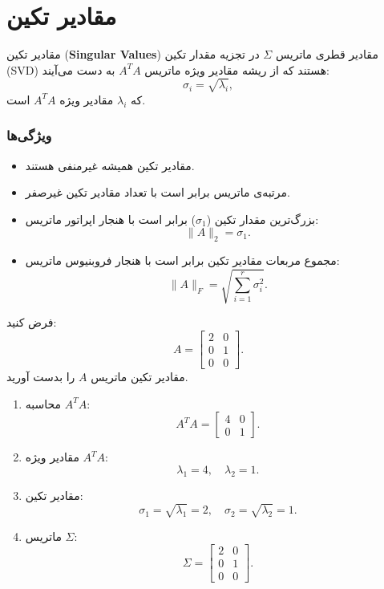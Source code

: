 \section{مقادیر تکین}
\begin{definition}
	مقادیر تکین (\textbf{Singular Values}) مقادیر قطری ماتریس \(\Sigma\) در تجزیه مقدار تکین (SVD) هستند که از ریشه مقادیر ویژه ماتریس \(A^T A\) به دست می‌آیند:
	\[
	\sigma_i = \sqrt{\lambda_i},
	\]
	که \(\lambda_i\) مقادیر ویژه \(A^T A\) است.
\end{definition}
\subsubsection{ویژگی‌ها}
\begin{itemize}
	\item مقادیر تکین همیشه غیرمنفی هستند.
	\item مرتبه‌ی ماتریس برابر است با تعداد مقادیر تکین غیرصفر.
	\item بزرگ‌ترین مقدار تکین (\(\sigma_1\)) برابر است با هنجار اپراتور ماتریس:
	\[
	\|A\|_2 = \sigma_1.
	\]
	\item مجموع مربعات مقادیر تکین برابر است با هنجار فروبنیوس ماتریس:
	\[
	\|A\|_F = \sqrt{\sum_{i=1}^r \sigma_i^2}.
	\]
\end{itemize}
\begin{example}
	
	فرض کنید:
	\[
	A = \begin{bmatrix}
		2 & 0 \\
		0 & 1 \\
		0 & 0
	\end{bmatrix}.
	\]
	مقادیر تکین ماتریس 
	$A$
	را بدست آورید.
\end{example}
\begin{solution}
	
	\begin{enumerate}
		\item محاسبه \(A^T A\):
		\[
		A^T A = \begin{bmatrix}
			4 & 0 \\
			0 & 1
		\end{bmatrix}.
		\]
		\item مقادیر ویژه \(A^T A\):
		\[
		\lambda_1 = 4, \quad \lambda_2 = 1.
		\]
		\item مقادیر تکین:
		\[
		\sigma_1 = \sqrt{\lambda_1} = 2, \quad \sigma_2 = \sqrt{\lambda_2} = 1.
		\]
		\item ماتریس \(\Sigma\):
		\[
		\Sigma = \begin{bmatrix}
			2 & 0 \\
			0 & 1 \\
			0 & 0
		\end{bmatrix}.
		\]
	\end{enumerate}
\end{solution}
